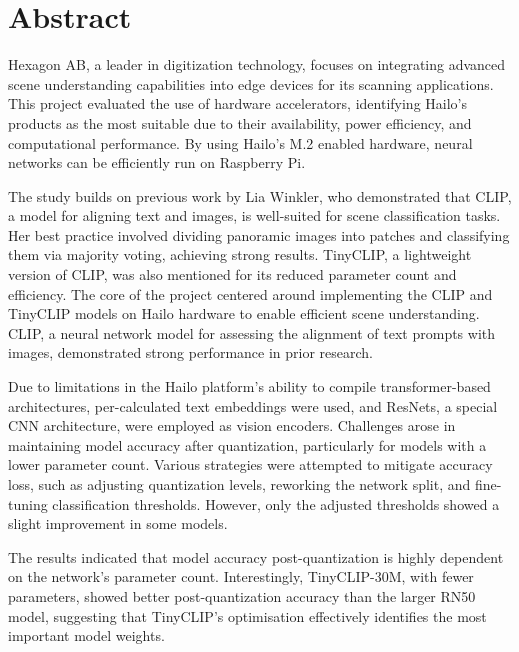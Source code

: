 %
%
%

\chapter*{Abstract}

Hexagon AB, a leader in digitization technology, focuses on integrating advanced scene understanding capabilities into edge devices for its scanning applications.
This project evaluated the use of hardware accelerators, identifying Hailo's products as the most suitable due to their availability, power efficiency, and computational performance.
By using Hailo's M.2 enabled hardware, neural networks can be efficiently run on Raspberry Pi.\hfill\break 


The study builds on previous work by Lia Winkler, who demonstrated that CLIP, a model for aligning text and images, is well-suited for scene classification tasks.
Her best practice involved dividing panoramic images into patches and classifying them via majority voting, achieving strong results.
TinyCLIP, a lightweight version of CLIP, was also mentioned for its reduced parameter count and efficiency.
The core of the project centered around implementing the CLIP and TinyCLIP models on Hailo hardware to enable efficient scene understanding.
CLIP, a neural network model for assessing the alignment of text prompts with images, demonstrated strong performance in prior research.

Due to limitations in the Hailo platform's ability to compile transformer-based architectures, per-calculated text embeddings were used, and ResNets, a special CNN architecture, were employed as vision encoders.
Challenges arose in maintaining model accuracy after quantization, particularly for models with a lower parameter count.
Various strategies were attempted to mitigate accuracy loss, such as adjusting quantization levels, reworking the network split, and fine-tuning classification thresholds.
However, only the adjusted thresholds showed a slight improvement in some models.\hfill\break 

The results indicated that model accuracy post-quantization is highly dependent on the network’s parameter count. 
Interestingly, TinyCLIP-30M, with fewer parameters, showed better post-quantization accuracy than the larger RN50 model, suggesting that TinyCLIP's optimisation effectively identifies the most important model weights. 
    
	